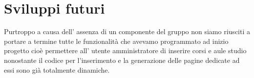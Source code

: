 \section{Sviluppi futuri}
Purtroppo a causa dell' assenza di un componente del gruppo non siamo riusciti a
portare a termine tutte le funzionalità che avevamo programmato ad inizio
progetto cioè permettere all' utente amministratore di inserire corsi e aule
studio nonostante il codice per l'inserimento e la generazione delle pagine
dedicate ad essi sono già totalmente dinamiche.
